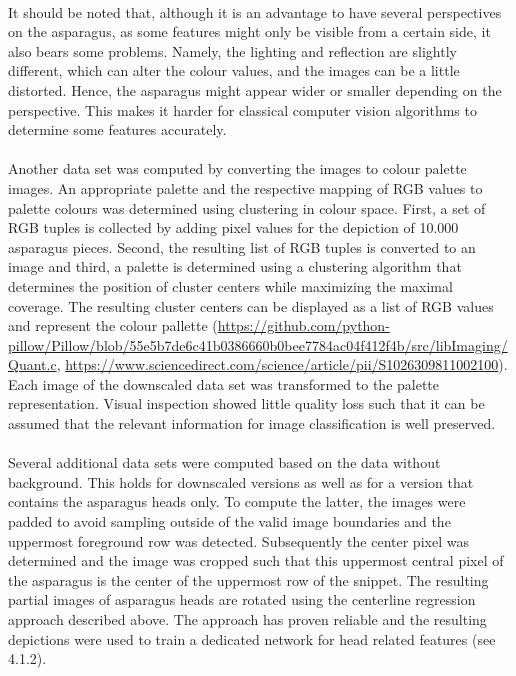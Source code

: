 \\
It should be noted that, although it is an advantage to have several perspectives on the asparagus, as some features might only be visible from a certain side, it also bears some problems. Namely, the lighting and reflection are slightly different, which can alter the colour values, and the images can be a little distorted. Hence, the asparagus might appear wider or smaller depending on the perspective. This makes it harder for classical computer vision algorithms to determine some features accurately. \\
\\
Another data set was computed by converting the images to colour palette images. An appropriate palette and the respective mapping of RGB values to palette colours was determined using clustering in colour space. First, a set of RGB tuples is collected by adding pixel values for the depiction of 10.000 asparagus pieces. Second, the resulting list of RGB tuples is converted to an image and third, a palette is determined using a clustering algorithm that determines the position of cluster centers while maximizing the  maximal coverage. The resulting cluster centers can be displayed as a list of RGB values and represent the colour pallette (\url{https://github.com/python-pillow/Pillow/blob/55e5b7de6c41b0386660b0bee7784ac04f412f4b/src/libImaging/Quant.c}, \url{https://www.sciencedirect.com/science/article/pii/S1026309811002100}). Each image of the downscaled data set was transformed to the palette representation. Visual inspection showed little quality loss such that it can be assumed that the relevant information for image classification is well preserved. \\
\\
Several additional data sets were computed based on the data without background. This holds for downscaled versions as well as for a version that contains the asparagus heads only. To compute the latter, the images were padded to avoid sampling outside of the valid image boundaries and the uppermost foreground row was detected. Subsequently the center pixel was determined and the image was cropped such that this uppermost central pixel of the asparagus is the center of the uppermost row of the snippet. The resulting partial images of asparagus heads are rotated using the centerline regression approach described above. The approach has proven reliable and the resulting depictions were used to train a dedicated network for head related features (see 4.1.2).



